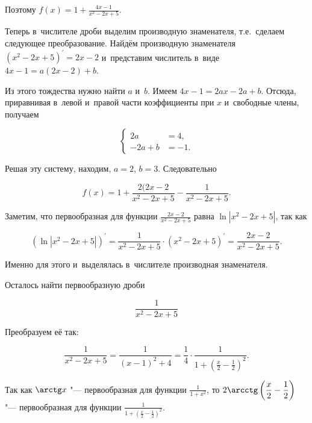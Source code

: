 Поэтому $\displaystyle f(x) = 1 + \frac{4x - 1}{x^{2} - 2x + 5}$.

Теперь в~числителе дроби выделим производную знаменателя, т.е.\ сделаем следующее
преобразование. Найдём производную знаменателя
$(x^{2} - 2x + 5)^\prime = 2x - 2$ и~представим числитель в~виде
$4x - 1 = a(2x -2) +b$.

Из этого тождества нужно найти $a$ и~$b$. Имеем $4x - 1 = 2ax - 2a + b$.
Отсюда, приравнивая в~левой и~правой части коэффициенты при $x$
и~свободные члены, получаем

\begin{equation*}
\begin{cases}
2a &= 4, \\
-2a + b &= -1.
\end{cases}
\end{equation*}

\noindent
Решая эту систему, находим, $a = 2$, $b = 3$. Следовательно

\begin{equation*}
\displaystyle f(x) = 1 + \frac{2(2x - 2}{x^{2} - 2x + 5} - \frac{1}{x^{2} - 2x + 5}.
\end{equation*}

Заметим, что первообразная для функции
$\displaystyle \frac{2x - 2}{x^{2} - 2x + 5}$ равна $\ln \left| x^{2} - 2x + 5 \right|$,
так как

\begin{equation*}
\displaystyle 
\left( \ln \left| x^{2} - 2x + 5 \right| \right)^\prime = 
\frac{1}{x^{2} - 2x + 5} \cdot \left( x^{2} - 2x + 5 \right)^\prime =
\frac{2x - 2}{x^{2} - 2x + 5}.
\end{equation*}

\noindent
Именно для этого и~выделялась в~числителе производная знаменателя.

Осталось найти первообразную дроби

\begin{equation*}
\displaystyle \frac{1}{x^{2} - 2x + 5}
\end{equation*}

\noindent
Преобразуем её так:

\begin{equation*}
\displaystyle \frac{1}{x^{2} - 2x + 5} = \frac{1}{(x-1)^{2} + 4} = 
\frac{1}{4} \cdot \frac{1}{1 + \left( \frac{x}{2} - \frac{1}{2} \right)^{2}}.
\end{equation*}

\noindent
Так как $\arctg x$ "--- первообразная для функции $\displaystyle \frac{1}{1 + x^{2}}$,
то $\displaystyle 2\arcctg \left( \frac{x}{2} - \frac{1}{2} \right)$
"--- первообразная для функции 
$\displaystyle \frac{1}{1 + \left( \frac{x}{2} - \frac{1}{2} \right)^{2}}$.

